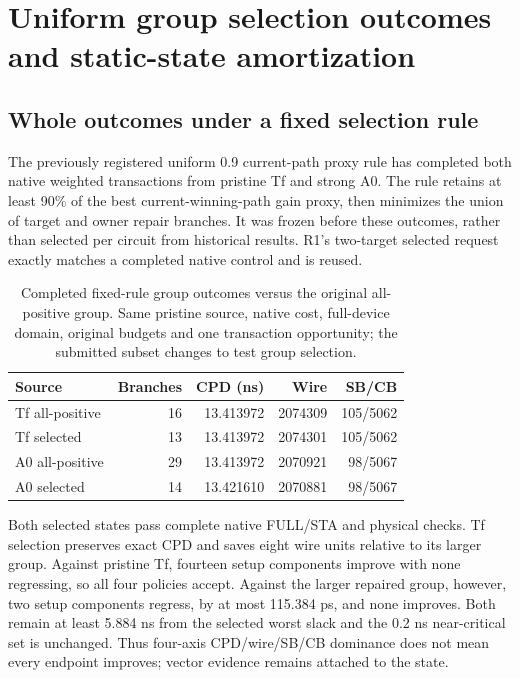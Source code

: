 
\section{Uniform group selection outcomes and static-state amortization}
\subsection{Whole outcomes under a fixed selection rule}
The previously registered uniform 0.9 current-path proxy rule has completed both native weighted transactions from pristine Tf and strong A0. The rule retains at least 90\% of the best current-winning-path gain proxy, then minimizes the union of target and owner repair branches. It was frozen before these outcomes, rather than selected per circuit from historical results. R1's two-target selected request exactly matches a completed native control and is reused.

\begin{table}[t]
\centering\small
\caption{Completed fixed-rule group outcomes versus the original all-positive group. Same pristine source, native cost, full-device domain, original budgets and one transaction opportunity; the submitted subset changes to test group selection.}
\begin{tabular}{lrrrr}
\hline
Source & Branches & CPD (ns) & Wire & SB/CB\\
\hline
Tf all-positive & 16 & 13.413972 & 2074309 & 105/5062\\
Tf selected & 13 & 13.413972 & 2074301 & 105/5062\\
A0 all-positive & 29 & 13.413972 & 2070921 & 98/5067\\
A0 selected & 14 & 13.421610 & 2070881 & 98/5067\\
\hline
\end{tabular}
\end{table}

Both selected states pass complete native FULL/STA and physical checks. Tf selection preserves exact CPD and saves eight wire units relative to its larger group. Against pristine Tf, fourteen setup components improve with none regressing, so all four policies accept. Against the larger repaired group, however, two setup components regress, by at most 115.384 ps, and none improves. Both remain at least 5.884 ns from the selected worst slack and the 0.2 ns near-critical set is unchanged. Thus four-axis CPD/wire/SB/CB dominance does not mean every endpoint improves; vector evidence remains attached to the state.

